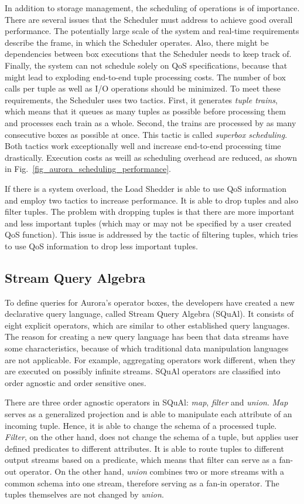 In addition to storage management, the scheduling of operations is of importance. There are several issues that the Scheduler must address to achieve good overall performance.  The potentially large scale of the system and real-time requirements describe the frame, in which the Scheduler operates. Also, there might be dependencies between box executions that the Scheduler needs to keep track of. Finally, the system can not schedule solely on QoS specifications, because that might lead to exploding end-to-end tuple processing costs. The number of box calls per tuple as well as I/O operations should be minimized. To meet these requirements, the Scheduler uses two tactics. First, it generates \textit{tuple trains}, which means that it queues as many tuples as possible before processing them and processes each train as a whole. Second, the trains are processed by as many consecutive boxes as possible at once. This tactic is called \textit{superbox scheduling}. Both tactics work exceptionally well and increase end-to-end processing time drastically. Execution costs as weill as scheduling overhead are reduced, as shown in Fig.~\ref{fig_aurora_scheduling_performance}.

If there is a system overload, the Load Shedder is able to use QoS information and employ two tactics to increase performance. It is able to drop tuples and also filter tuples. The problem with dropping tuples is that there are more important and less important tuples (which may or may not be specified by a user created QoS function). This issue is addressed by the tactic of filtering tuples, which tries to use QoS information to drop less important tuples.

\subsection{Stream Query Algebra}\label{squal}
To define queries for Aurora's operator boxes, the developers have created a new declarative query language, called Stream Query Algebra (SQuAl). It consists of eight explicit operators, which are similar to other established query languages. The reason for creating a new query language has been that data streams have some characteristics, because of which traditional data manipulation languages are not applicable. For example, aggregating operators work different, when they are executed on possibly infinite streams. SQuAl operators are classified into order agnostic and order sensitive ones.

There are three order agnostic operators in SQuAl: \textit{map}, \textit{filter} and \textit{union}. \textit{Map} serves as a generalized projection and is able to manipulate each attribute of an incoming tuple. Hence, it is able to change the schema of a processed tuple. \textit{Filter}, on the other hand, does not change the schema of a tuple, but applies user defined predicates to different attributes. It is able to route tuples to different output streams based on a predicate, which means that filter can serve as a fan-out operator. On the other hand, \textit{union} combines two or more streams with a common schema into one stream, therefore serving as a fan-in operator. The tuples themselves are not changed by \textit{union}.

